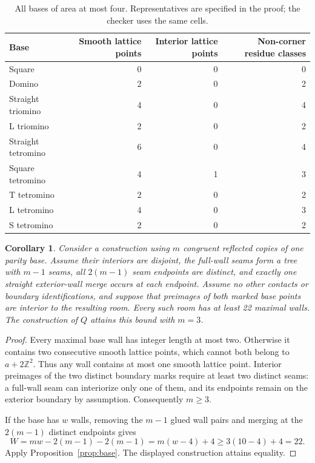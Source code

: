 \documentclass[11pt]{article}
\newtheorem{corollary}[theorem]{Corollary}
\theoremstyle{definition}\newtheorem{definition}[theorem]{Definition}
\begin{document}
\begin{table}[ht]
\centering\small
\begin{tabular}{@{}lrrr@{}}\toprule
Base & Smooth lattice points & Interior lattice points & Non-corner residue classes\\\midrule
Square & 0 & 0 & 0\\
Domino & 2 & 0 & 2\\
Straight triomino & 4 & 0 & 4\\
L triomino & 2 & 0 & 2\\
Straight tetromino & 6 & 0 & 4\\
Square tetromino & 4 & 1 & 3\\
T tetromino & 2 & 0 & 2\\
L tetromino & 4 & 0 & 3\\
S tetromino & 2 & 0 & 2\\\bottomrule
\end{tabular}
\caption{All bases of area at most four. Representatives are specified in the proof; the checker uses the same cells.}\label{tab:bases}
\end{table}

\begin{corollary}\label{cor:restricted}
Consider a construction using $m$ congruent reflected copies of one parity base. Assume their interiors are disjoint, the full-wall seams form a tree with $m-1$ seams, all $2(m-1)$ seam endpoints are distinct, and exactly one straight exterior-wall merge occurs at each endpoint. Assume no other contacts or boundary identifications, and suppose that preimages of both marked base points are interior to the resulting room. Every such room has at least 22 maximal walls. The construction of $Q$ attains this bound with $m=3$.
\end{corollary}
\begin{proof}
Every maximal base wall has integer length at most two. Otherwise it contains two consecutive smooth lattice points, which cannot both belong to $a+2\mathbb Z^2$. Thus any wall contains at most one smooth lattice point. Interior preimages of the two distinct boundary marks require at least two distinct seams: a full-wall seam can interiorize only one of them, and its endpoints remain on the exterior boundary by assumption. Consequently $m\ge3$.

If the base has $w$ walls, removing the $m-1$ glued wall pairs and merging at the $2(m-1)$ distinct endpoints gives
\[
 W=mw-2(m-1)-2(m-1)=m(w-4)+4\ge 3(10-4)+4=22.
\]
Apply Proposition~\ref{prop:base}. The displayed construction attains equality.
\end{proof}
\end{document}
